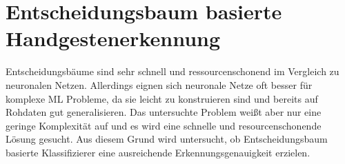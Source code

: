 \chapter{Entscheidungsbaum basierte Handgestenerkennung}
Entscheidungsbäume sind sehr schnell und ressourcenschonend im Vergleich zu neuronalen Netzen. Allerdings eignen sich neuronale Netze oft besser für komplexe ML Probleme, da sie leicht zu konstruieren sind
und bereits auf Rohdaten gut generalisieren. Das untersuchte Problem weißt aber nur eine geringe Komplexität auf und es wird eine schnelle und resourcenschonende Lösung gesucht.
Aus diesem Grund wird untersucht, ob Entscheidungsbaum basierte Klassifizierer eine ausreichende Erkennungsgenauigkeit erzielen.




